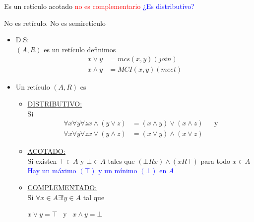 \documentclass[../main.tex]{subfiles}
\begin{document}
Es un retículo acotado \textcolor{red}{no es complementario}
\textcolor{blue}{¿Es distributivo?}
\begin{figure}[H]
	\centering
	
\end{figure}

No es retículo. No es semiretículo
\begin{figure}[H]
	\centering
	
\end{figure}

\begin{itemize}
	\item D.S:\\
		$(A,R)$ es un retículo definimos
		\begin{align*}
			x\vee y &= mcs(x,y)(join)\\
			x\wedge y &= MCI(x,y)(meet)
		\end{align*}
	\item Un retículo $(A,R)$ es
		\begin{itemize}
			\item \underline{\underline{DISTRIBUTIVO:}}\\
			Si
			\begin{align*}
				\forall x \forall y \forall z x \wedge (y \vee z ) &= (x \wedge y) \vee (x \wedge z)
					&& \text{y}\\
				\forall x \forall y \forall z x \vee (y \wedge z ) &= (x \vee y) \wedge (x \vee z)
			\end{align*}
		\item \underline{\underline{ACOTADO:}}\\
			Si existen $\top \in A$ y $\bot \in A$
			tales que $(\bot Rx)\wedge (xR\top)$
			para todo $x\in A$\\
			\textcolor{blue}{Hay un máximo $(\top)$ y un mínimo $(\bot )$ en $A$}
		\item \underline{\underline{COMPLEMENTADO:}}\\
			Si $\forall x \in A \exists ! y \in A$ tal que
			\begin{center}
				$x \vee y = \top$ \ y \ $x \wedge y = \bot$
			\end{center}
		\end{itemize}
\end{itemize}
\end{document}
